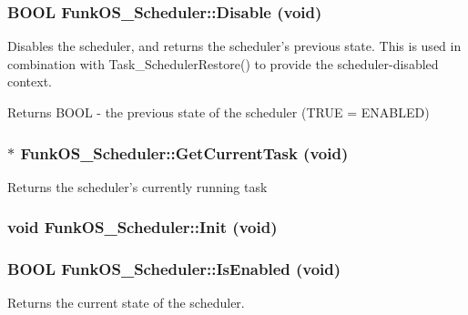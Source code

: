 \subsubsection[{Disable}]{\setlength{\rightskip}{0pt plus 5cm}BOOL FunkOS\_\-Scheduler::Disable (void)\hspace{0.3cm}{\ttfamily  [static]}}\label{class_funk_o_s___scheduler_a83877eda6eb09076994f04cfa4c42591}
Disables the scheduler, and returns the scheduler's previous state. This is used in combination with Task\_\-SchedulerRestore() to provide the scheduler-\/disabled context.

\begin{DoxyReturn}{Returns}
BOOL -\/ the previous state of the scheduler (TRUE = ENABLED) 
\end{DoxyReturn}
\subsubsection[{GetCurrentTask}]{ $\ast$ FunkOS\_\-Scheduler::GetCurrentTask (void)\hspace{0.3cm}{\ttfamily  [static]}}\label{class_funk_o_s___scheduler_a8f87200d50cf12517f050508208042b1}
Returns the scheduler's currently running task 
\subsubsection[{Init}]{\setlength{\rightskip}{0pt plus 5cm}void FunkOS\_\-Scheduler::Init (void)\hspace{0.3cm}{\ttfamily  [static]}}\label{class_funk_o_s___scheduler_ae4cc26ef4ed0c9f83f51d658e015c9e9}
\subsubsection[{IsEnabled}]{\setlength{\rightskip}{0pt plus 5cm}BOOL FunkOS\_\-Scheduler::IsEnabled (void)\hspace{0.3cm}{\ttfamily  [static]}}\label{class_funk_o_s___scheduler_aea90e03f77421182dab74eb89165a7ae}
Returns the current state of the scheduler.

